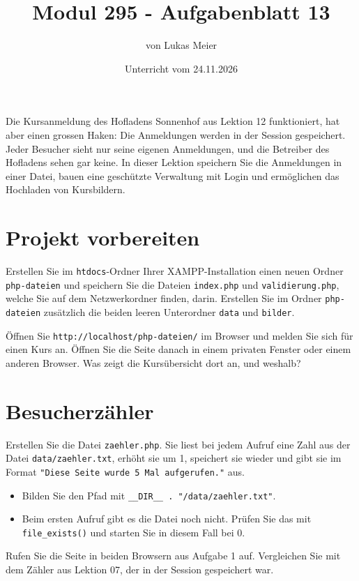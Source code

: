\documentclass[a4paper,12pt]{article}
\title{Modul 295 - Aufgabenblatt 13}
\author{von Lukas Meier}
\date{Unterricht vom 24.11.2026}
\begin{document}
\maketitle

Die Kursanmeldung des Hofladens Sonnenhof aus Lektion 12 funktioniert, hat aber einen grossen Haken: Die Anmeldungen werden in der Session gespeichert. Jeder Besucher sieht nur seine eigenen Anmeldungen, und die Betreiber des Hofladens sehen gar keine. In dieser Lektion speichern Sie die Anmeldungen in einer Datei, bauen eine geschützte Verwaltung mit Login und ermöglichen das Hochladen von Kursbildern.

\section{Projekt vorbereiten}

Erstellen Sie im \texttt{htdocs}-Ordner Ihrer XAMPP-Installation einen neuen Ordner \texttt{php-dateien} und speichern Sie die Dateien \texttt{index.php} und \texttt{validierung.php}, welche Sie auf dem Netzwerkordner finden, darin. Erstellen Sie im Ordner \texttt{php-dateien} zusätzlich die beiden leeren Unterordner \texttt{data} und \texttt{bilder}.

Öffnen Sie \texttt{http://localhost/php-dateien/} im Browser und melden Sie sich für einen Kurs an. Öffnen Sie die Seite danach in einem privaten Fenster oder einem anderen Browser. Was zeigt die Kursübersicht dort an, und weshalb?

\section{Besucherzähler}

Erstellen Sie die Datei \texttt{zaehler.php}. Sie liest bei jedem Aufruf eine Zahl aus der Datei \texttt{data/zaehler.txt}, erhöht sie um 1, speichert sie wieder und gibt sie im Format \texttt{"{}Diese Seite wurde 5 Mal aufgerufen."{}} aus.

\begin{itemize}
    \item Bilden Sie den Pfad mit \texttt{\_\_DIR\_\_ . "{}/data/zaehler.txt"{}}.
    \item Beim ersten Aufruf gibt es die Datei noch nicht. Prüfen Sie das mit \texttt{file\_exists()} und starten Sie in diesem Fall bei 0.
\end{itemize}

Rufen Sie die Seite in beiden Browsern aus Aufgabe 1 auf. Vergleichen Sie mit dem Zähler aus Lektion 07, der in der Session gespeichert war.
\end{document}

